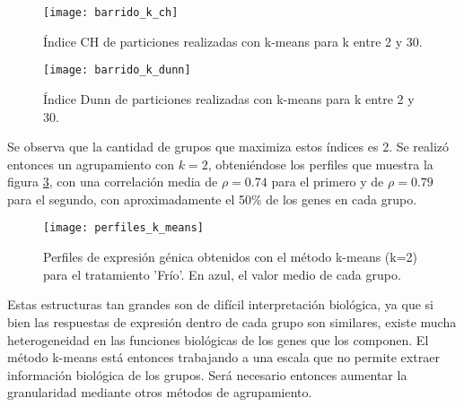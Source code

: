 \begin{figure*}[t!]
    \centering
    \begin{subfigure}[t]{0.45\textwidth}
    \centering
    \texttt{[image: barrido\_k\_ch]}
    \caption{Índice CH de particiones realizadas con k-means para k entre 2 y 30.}
    \label{fig:barrido_k_ch}
    \end{subfigure}
    \begin{subfigure}[t]{0.45\textwidth}
    \centering
    \texttt{[image: barrido\_k\_dunn]}
    \caption{Índice Dunn de particiones realizadas con k-means para k entre 2 y 30.}
    \label{fig:barrido_k_dunn}
    \end{subfigure}
    \caption{Índices de validación interna para particiones realizadas con k-means}
\end{figure*}
Se observa que la cantidad de grupos que maximiza estos índices es 2. Se realizó entonces un agrupamiento con $k=2$, obteniéndose los perfiles que muestra la figura \ref{fig:perfiles_k_means}, con una correlación media de $\rho=0.74$ para el primero y de  $\rho=0.79$ para el segundo, con aproximadamente el 50\% de los genes en cada grupo.
\begin{figure}[h]
    \centering
    \texttt{[image: perfiles\_k\_means]}
    \caption{Perfiles de expresión génica obtenidos con el método k-means (k=2) para el tratamiento 'Frío'. En azul, el valor medio de cada grupo.}
    \label{fig:perfiles_k_means}
\end{figure}
Estas estructuras tan grandes son de difícil interpretación biológica, ya que si bien las respuestas de expresión dentro de cada grupo son similares, existe mucha heterogeneidad en las funciones biológicas de los genes que los componen. El método k-means está entonces trabajando a una escala que no permite extraer información biológica de los grupos. Será necesario entonces aumentar la granularidad mediante otros métodos de agrupamiento.
